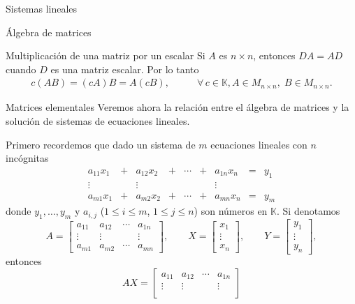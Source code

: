 \documentclass[a4paper,12pt,twoside,spanish,reqno]{amsbook}
\theoremstyle{definition}
\theoremstyle{remark}
\newcommand{\K}{\mathbb K}
\begin{document}
\begin{chapter}{Sistemas lineales}
\begin{section}{Álgebra de matrices}
\begin{subsection}{Multiplicación de una matriz por un escalar}
			Si $A$ es $n \times n$,  entonces $DA = AD$ cuando $D$  es una matriz escalar. Por lo tanto
			\begin{align*}
			c(A B) = (cA) B = A(cB),\qquad &\forall\, c \in \K,  A \in M_{n \times n}, \;B \in M_{n \times n}.
			\end{align*} 

		\end{subsection}
			
			
		\end{section}
		
		\begin{section}{Matrices elementales}
			Veremos ahora la relación entre el álgebra de matrices y la solución de sistemas de ecuaciones lineales. 
			
			Primero recordemos que dado un sistema de $m$  ecuaciones lineales con $n$ incógnitas
			\begin{equation}\label{sist-eq-gen-3}
			\begin{matrix}
			a_{11}x_1& + &a_{12}x_2& + &\cdots& + &a_{1n}x_n &= &y_1\\
			\vdots&  &\vdots& &&  &\vdots \\
			a_{m1}x_1& + &a_{m2}x_2& + &\cdots& + &a_{mn}x_n &=&y_m
			\end{matrix}
			\end{equation}
			donde $y_1, \ldots,y_m$ y $a_{i,j}$ ($1 \le i \le m$, $1 \le j \le n$) son números en $\K$. Si denotamos
			\begin{equation*}
			A = \begin{bmatrix}
			a_{11}& a_{12}& \cdots &a_{1n} \\
			\vdots&\vdots  &  &\vdots \\
			a_{m1} &a_{m2}&\cdots &a_{mn}\end{bmatrix},\qquad
			X = \begin{bmatrix}
			x_1 \\ \vdots \\ x_n 
			\end{bmatrix},
			\qquad 
			Y = \begin{bmatrix}
			y_1 \\ \vdots \\ y_n
			\end{bmatrix},
			\end{equation*}
			entonces 
			\begin{equation*}
			AX = \begin{bmatrix}
			a_{11}& a_{12}& \cdots &a_{1n} \\
			\vdots&\vdots  &  &\vdots \\

\end{bmatrix}
\end{equation*}
\end{section}
\end{chapter}
\end{document}
